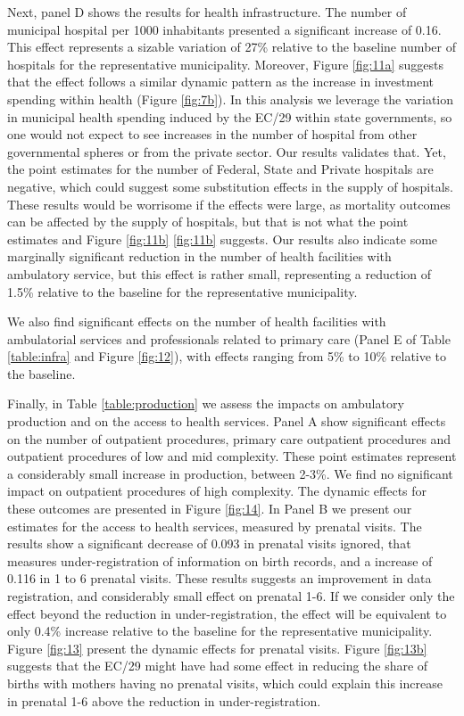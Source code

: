 

Next, panel D shows the results for health infrastructure. The number of municipal hospital per 1000 inhabitants presented a significant increase of 0.16. This effect represents a sizable variation of 27\% relative to the baseline number of hospitals for the representative municipality. Moreover, Figure \ref{fig:11a} suggests that the effect follows a similar dynamic pattern as the increase in investment spending within health (Figure \ref{fig:7b}). In this analysis we leverage the variation in municipal health spending induced by the EC/29 within state governments, so one would not expect to see increases in the number of hospital from other governmental spheres or from the private sector. Our results validates that. Yet, the point estimates for the number of Federal, State and Private hospitals are negative, which could suggest some substitution effects in the supply of hospitals. These results would be worrisome if the effects were large, as mortality outcomes can be affected by the supply of hospitals, but that is not what the point estimates and Figure \ref{fig:11b} \ref{fig:11b} suggests. Our results also indicate some marginally significant reduction in the number of health facilities with ambulatory service, but this effect is rather small, representing a reduction of 1.5\% relative to the baseline for the representative municipality.



We also find significant effects on the number of health facilities with ambulatorial services and professionals related to primary care (Panel E of Table \ref{table:infra} and Figure \ref{fig:12}), with effects ranging from 5\% to 10\% relative to the baseline.



Finally, in Table \ref{table:production} we assess the impacts on ambulatory production and on the access to health services. Panel A show significant effects on the number of outpatient procedures, primary care outpatient procedures and outpatient procedures of low and mid complexity. These point estimates represent a considerably small increase in production, between 2-3\%. We find no significant impact on outpatient procedures of high complexity. The dynamic effects for these outcomes are presented in Figure \ref{fig:14}. In Panel B we present our estimates for the access to health services, measured by prenatal visits. The results show a significant decrease of 0.093 in prenatal visits ignored, that measures under-registration of information on birth records, and a increase of 0.116 in 1 to 6 prenatal visits. These results suggests an improvement in data registration, and considerably small effect on prenatal 1-6. If we consider only the effect beyond the reduction in under-registration, the effect will be equivalent to only 0.4\% increase relative to the baseline for the representative municipality. Figure \ref{fig:13} present the dynamic effects for prenatal visits. Figure \ref{fig:13b} suggests that the EC/29 might have had some effect in reducing the share of births with mothers having no prenatal visits, which could explain this increase in prenatal 1-6 above the reduction in under-registration.

